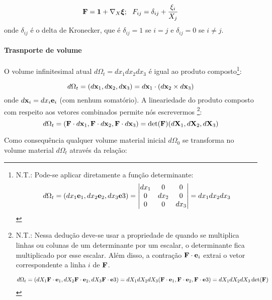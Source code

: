\documentclass[
	11pt, %
	fleqn, %
	a4paper, %
]{LegrandOrangeBook}
\begin{document}
\begin{equation}
	\label{eq:Fll=1+nablaXil}	
	\textbf{F} = \bm{1} + \nabla_X \bm{\xi}; ~~ F_{ij} = \delta_{ij}+\dfrac{\xi_i}{X_j}
\end{equation}	
onde $\delta_{ij}$ é o delta de Kronecker, que é $\delta_{ij}=1$ se $i=j$ e $\delta_{ij}=0$ se $i \neq j$.

\paragraph{Trasnporte de volume} O volume infinitesimal atual $d\Omega_t=dx_1 dx_2 dx_3$ é igual ao produto composto\footnote{N.T.: Pode-se aplicar diretamente a função determinante:
	\begin{displaymath}	
	d\Omega_t = (dx_1\textbf{e}_1, dx_2\textbf{e}_2, dx_3\textbf{e}3) = \begin{vmatrix}
	dx_1 & 0 & 0 \\
	0	& dx_2  & 0 \\
	0	& 0 & dx_3
	\end{vmatrix} = dx_1 dx_2 dx_3	
	\end{displaymath}
}:

\begin{equation}
	\label{eq:domegat}	
	d\Omega_t = (d\textbf{x}_1, d\textbf{x}_2, d\textbf{x}_3) = d\textbf{x}_1 \cdot (d\textbf{x}_2 \times d\textbf{x}_3)
\end{equation}	
onde $d\textbf{x}_i=dx_i\textbf{e}_i$ (com nenhum somatório). A lineariedade do produto composto com respeito aos vetores combinados permite nós escrevermos \footnote{N.T.: Nessa dedução deve-se usar a propriedade de quando se multiplica linhas ou colunas de um determinante por um escalar, o determinante fica multiplicado por esse escalar. Além disso, a contração $\textbf{F} \cdot \textbf{e}_i$ extrai o vetor correspondente a linha $i$ de $\textbf{F}$.

	\begin{displaymath}	
	d\Omega_t = (dX_1 \textbf{F} \cdot \textbf{e}_1, dX_2 \textbf{F} \cdot \textbf{e}_2, dX_3 \textbf{F} \cdot \textbf{e}3) = dX_1 dX_2 dX_3(\textbf{F} \cdot \textbf{e}_1, \textbf{F} \cdot \textbf{e}_2, \textbf{F} \cdot \textbf{e}3) = dX_1 dX_2 dX_3 \det(\textbf{F})
\end{displaymath}

}:
\begin{equation}
	\label{eq:domegat2}	
	d\Omega_t = (\textbf{F} \cdot d\textbf{x}_1, \textbf{F} \cdot d\textbf{x}_2, \textbf{F} \cdot d\textbf{x}_3) = \det (\textbf{F})(d\textbf{X}_1, d\textbf{X}_2, d\textbf{X}_3)
\end{equation}

Como consequência qualquer volume material inicial $d\Omega_0$ se transforma no volume material $d\Omega_t$ através da relação:
\end{document}
